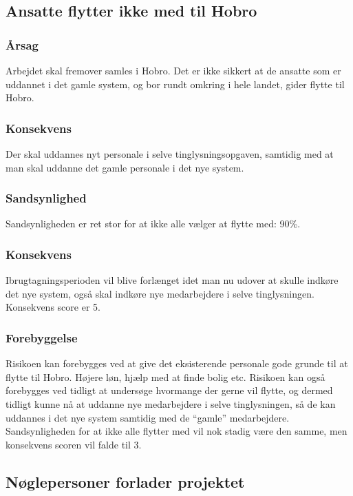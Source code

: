\documentclass[10pt,a4paper,danish]{article}
\begin{document}
\subsection{Ansatte flytter ikke med til Hobro}
\subsubsection{Årsag}
Arbejdet skal fremover samles i Hobro. Det er ikke sikkert at de ansatte som er uddannet i det gamle system, og bor rundt omkring i hele landet, gider flytte til Hobro.

\subsubsection{Konsekvens}
Der skal uddannes nyt personale i selve tinglysningsopgaven, samtidig med at man skal uddanne det gamle personale i det nye system.

\subsubsection{Sandsynlighed}
Sandsynligheden er ret stor for at ikke alle vælger at flytte med: 90\%.

\subsubsection{Konsekvens}
Ibrugtagningsperioden vil blive forlænget idet man nu udover at skulle indkøre det nye system, også skal indkøre nye medarbejdere i selve tinglysningen. Konsekvens score er 5.

\subsubsection{Forebyggelse}
Risikoen kan forebygges ved at give det eksisterende personale gode grunde til at flytte til Hobro. Højere løn, hjælp med at finde bolig etc. Risikoen kan også forebygges ved tidligt at undersøge hvormange der gerne vil flytte, og dermed tidligt kunne nå at uddanne nye medarbejdere i selve tinglysningen, så de kan uddannes i det nye system samtidig med de "`gamle"' medarbejdere. Sandsynligheden for at ikke alle flytter med vil nok stadig være den samme, men konsekvens scoren vil falde til 3.

\subsection{Nøglepersoner forlader projektet}
\end{document}
